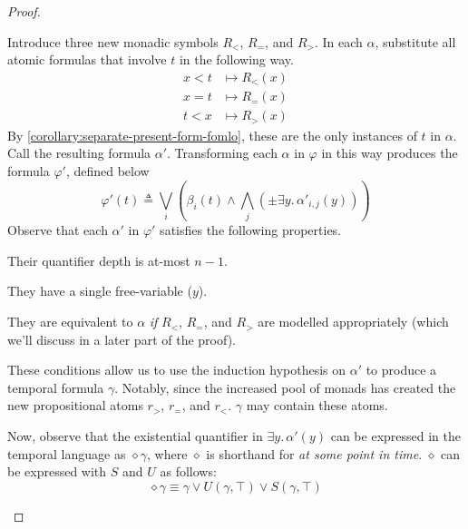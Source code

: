 \documentclass[a4paper,UKenglish,cleveref, autoref, thm-restate, numberwithinsect]{lipics-v2021}
\begin{document}
\begin{proof}
\begin{description}
        Introduce three new monadic symbols $R_<$, $R_=$, and $R_>$. In each $\alpha$, substitute all atomic formulas that involve $t$ in the following way.
        \begin{equation*}
            \begin{aligned}
                x < t &\longmapsto R_<(x)\\
                x = t &\longmapsto R_=(x)\\
                t < x  &\longmapsto R_>(x)
            \end{aligned}
        \end{equation*}
        By \cref{corollary:separate-present-form-fomlo}, these are the only instances of $t$ in $\alpha$. Call the resulting formula $\alpha'$. Transforming each $\alpha$ in $\varphi$ in this way produces the formula $\varphi'$, defined below
        \begin{equation}
            \label{eq:present-separate-form-fomlo-without-t}
            \varphi'(t) \triangleq \bigvee_i \left( \beta_i(t) \land \bigwedge_j \left( \pm \exists y.\, \alpha'_{i, j}\left(y\right) \right) \right)
        \end{equation}
        Observe that each $\alpha'$ in $\varphi'$ satisfies the following properties.
        \begin{alphaenumerate}
            \item Their quantifier depth is at-most $n - 1$.
            \item They have a single free-variable ($y$).
            \item They are equivalent to $\alpha$ \textit{if} $R_<$, $R_=$, and $R_>$ are modelled appropriately (which we'll discuss in a later part of the proof).
        \end{alphaenumerate}
        These conditions allow us to use the induction hypothesis on $\alpha'$ to produce a temporal formula $\gamma$. Notably, since the increased pool of monads has created the new propositional atoms $r_>$, $r_=$, and $r_<$. $\gamma$ may contain these atoms.

        Now, observe that the existential quantifier in $\exists y.\, \alpha'(y)$ can be expressed in the temporal language as $\diamond \gamma$, where $\diamond$ is shorthand for \textit{at some point in time}. $\diamond$ can be expressed with $S$ and $U$ as follows:
        \begin{equation*}
            \diamond \gamma \equiv \gamma \lor U(\gamma,\top) \lor S(\gamma, \top)
        \end{equation*}


\end{description}
\end{proof}
\end{document}
